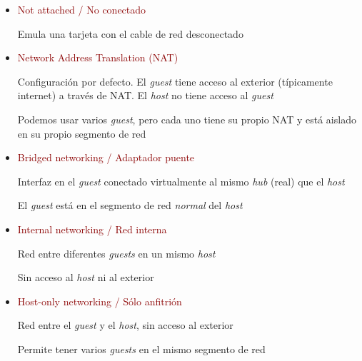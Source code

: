\documentclass[ucs]{beamer}
\newcommand{\res}[1]{\textcolor{darkred}{#1}}
\begin{document}
\begin{frame}[fragile]
\begin{itemize}
\item
\res{Not attached / No conectado}

Emula una tarjeta con el cable de red desconectado
\item
\res{Network Address Translation (NAT)}

Configuración por defecto. El \emph{guest} tiene acceso al exterior (típicamente internet) a través 
de NAT. El 
\emph{host}
no tiene acceso al
\emph{guest}

Podemos usar varios \emph{guest}, pero cada uno tiene su propio
NAT y está aislado en su propio segmento de red

\item
\res{Bridged networking / Adaptador puente}

Interfaz en el \emph{guest} conectado virtualmente al mismo \emph{hub} (real) que el \emph{host}

El \emph{guest} está en el segmento de red \emph{normal} del \emph{host}

\item
\res{Internal networking / Red interna}

Red entre diferentes \emph{guests} en un mismo \emph{host}

Sin acceso al \emph{host} ni al exterior
\item
\res{Host-only networking / Sólo anfitrión}

Red entre el \emph{guest} y el \emph{host}, sin acceso al exterior

Permite tener varios \emph{guests} en el mismo segmento
de red
\end{itemize}


\end{frame}
\end{document}
